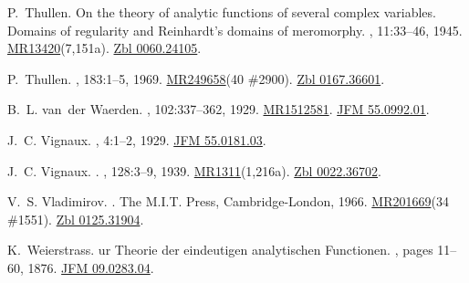 \documentclass[11pt,a4paper, final, twoside]{article}
\numberwithin{equation}{section}
\begin{document}
\begin{appendices}
\begin{thebibliography}{100}
P.~Thullen.
\newblock On the theory of analytic functions of several complex variables.
  {D}omains of regularity and {R}einhardt's domains of meromorphy.
, 11:33--46, 1945.
\newblock
  \href{http://www.ams.org/mathscinet-getitem?mr=13420}{MR13420}(7,151a).
  \href{http://zbmath.org/?q=an:0060.24105}{Zbl 0060.24105}.

P.~Thullen.
, 183:1--5, 1969.
\newblock \href{http://www.ams.org/mathscinet-getitem?mr=249658}{MR249658}(40
  \#2900). \href{http://zbmath.org/?q=an:0167.36601}{Zbl 0167.36601}.

B.~L. van~der Waerden.
, 102:337--362, 1929.
\newblock \href{http://www.ams.org/mathscinet-getitem?mr=1512581}{MR1512581}.
  \href{http://zbmath.org/?q=an:55.0992.01}{JFM 55.0992.01}.

J.~C. Vignaux.
, 4:1--2,
  1929.
\newblock \href{http://zbmath.org/?q=an:55.0181.03}{JFM 55.0181.03}.

J.~C. Vignaux.
.
, 128:3--9, 1939.
\newblock \href{http://www.ams.org/mathscinet-getitem?mr=1311}{MR1311}(1,216a).
  \href{http://zbmath.org/?q=an:0022.36702}{Zbl 0022.36702}.

V.~S. Vladimirov.
.
\newblock The M.I.T. Press, Cambridge-London, 1966.
\newblock \href{http://www.ams.org/mathscinet-getitem?mr=201669}{MR201669}(34
  \#1551). \href{http://zbmath.org/?q=an:0125.31904}{Zbl 0125.31904}.

K.~Weierstrass.
ur {T}heorie der eindeutigen analytischen {F}unctionen.
, pages 11--60, 1876.
\newblock \href{http://zbmath.org/?q=an:09.0283.04}{JFM 09.0283.04}.


\end{thebibliography}
\end{appendices}
\end{document}
